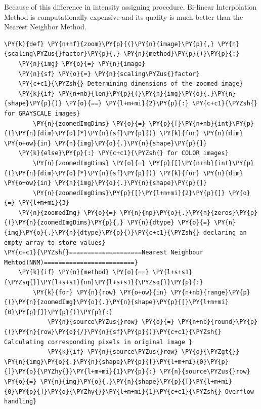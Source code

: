 \documentclass[a4paper,10pt]{article}%
\begin{document}
Because of this difference in  intensity assigning procedure, Bi-linear Interpolation Method is computationally expensive and its quality is much better than the Nearest Neighbor Method. 
\vfill  
    \begin{tcolorbox}[breakable, size=fbox, boxrule=1pt, pad at break*=1mm,colback=cellbackground, colframe=cellborder]
\begin{Verbatim}[commandchars=\\\{\}]
\PY{k}{def} \PY{n+nf}{zoom}\PY{p}{(}\PY{n}{image}\PY{p}{,} \PY{n}{scaling\PYZus{}factor}\PY{p}{,} \PY{n}{method}\PY{p}{)}\PY{p}{:}
    \PY{n}{img} \PY{o}{=} \PY{n}{image}
    \PY{n}{sf} \PY{o}{=} \PY{n}{scaling\PYZus{}factor}
    \PY{c+c1}{\PYZsh{} Determining dimensions of the zoomed image}
    \PY{k}{if} \PY{n+nb}{len}\PY{p}{(}\PY{n}{img}\PY{o}{.}\PY{n}{shape}\PY{p}{)} \PY{o}{==} \PY{l+m+mi}{2}\PY{p}{:} \PY{c+c1}{\PYZsh{} for GRAYSCALE images}
        \PY{n}{zoomedImgDims} \PY{o}{=} \PY{p}{[}\PY{n+nb}{int}\PY{p}{(}\PY{n}{dim}\PY{o}{*}\PY{n}{sf}\PY{p}{)} \PY{k}{for} \PY{n}{dim} \PY{o+ow}{in} \PY{n}{img}\PY{o}{.}\PY{n}{shape}\PY{p}{]}
    \PY{k}{else}\PY{p}{:} \PY{c+c1}{\PYZsh{} for COLOR images}
        \PY{n}{zoomedImgDims} \PY{o}{=} \PY{p}{[}\PY{n+nb}{int}\PY{p}{(}\PY{n}{dim}\PY{o}{*}\PY{n}{sf}\PY{p}{)} \PY{k}{for} \PY{n}{dim} \PY{o+ow}{in} \PY{n}{img}\PY{o}{.}\PY{n}{shape}\PY{p}{]}
        \PY{n}{zoomedImgDims}\PY{p}{[}\PY{l+m+mi}{2}\PY{p}{]} \PY{o}{=} \PY{l+m+mi}{3}
    \PY{n}{zoomedImg} \PY{o}{=} \PY{n}{np}\PY{o}{.}\PY{n}{zeros}\PY{p}{(}\PY{n}{zoomedImgDims}\PY{p}{,} \PY{n}{dtype} \PY{o}{=} \PY{n}{img}\PY{o}{.}\PY{n}{dtype}\PY{p}{)}\PY{c+c1}{\PYZsh{} declaring an empty array to store values}
\PY{c+c1}{\PYZsh{}====================Nearest Neighbour Mehtod(NNM)=========================}
    \PY{k}{if} \PY{n}{method} \PY{o}{==} \PY{l+s+s1}{\PYZsq{}}\PY{l+s+s1}{nn}\PY{l+s+s1}{\PYZsq{}}\PY{p}{:}        
        \PY{k}{for} \PY{n}{row} \PY{o+ow}{in} \PY{n+nb}{range}\PY{p}{(}\PY{n}{zoomedImg}\PY{o}{.}\PY{n}{shape}\PY{p}{[}\PY{l+m+mi}{0}\PY{p}{]}\PY{p}{)}\PY{p}{:}
            \PY{n}{source\PYZus{}row} \PY{o}{=} \PY{n+nb}{round}\PY{p}{(}\PY{n}{row}\PY{o}{/}\PY{n}{sf}\PY{p}{)}\PY{c+c1}{\PYZsh{} Calculating corresponding pixels in original image }
            \PY{k}{if} \PY{n}{source\PYZus{}row} \PY{o}{\PYZgt{}} \PY{n}{img}\PY{o}{.}\PY{n}{shape}\PY{p}{[}\PY{l+m+mi}{0}\PY{p}{]}\PY{o}{\PYZhy{}}\PY{l+m+mi}{1}\PY{p}{:} \PY{n}{source\PYZus{}row} \PY{o}{=} \PY{n}{img}\PY{o}{.}\PY{n}{shape}\PY{p}{[}\PY{l+m+mi}{0}\PY{p}{]}\PY{o}{\PYZhy{}}\PY{l+m+mi}{1}\PY{c+c1}{\PYZsh{} Overflow handling}

\end{Verbatim}
\end{tcolorbox}
\end{document}

